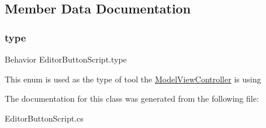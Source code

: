 \subsection{Member Data Documentation}
\mbox{\label{class_editor_button_script_a7df9834d8c560512d210be3c1454edd9}} 
\subsubsection{\texorpdfstring{type}{type}}
{\footnotesize\ttfamily Behavior Editor\+Button\+Script.\+type}



This enum is used as the type of tool the \hyperlink{class_model_view_controller}{Model\+View\+Controller} is using 



The documentation for this class was generated from the following file\+:\begin{DoxyCompactItemize}
\item 
Editor\+Button\+Script.\+cs\end{DoxyCompactItemize}
